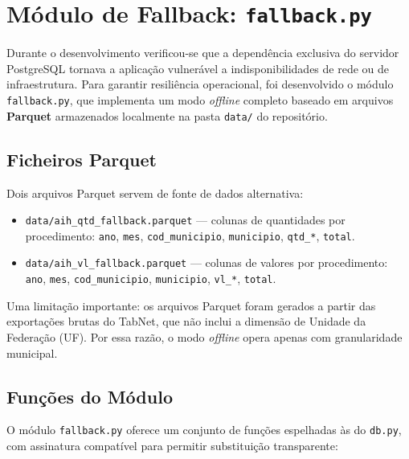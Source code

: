 \documentclass[12pt,a4paper]{report}
\begin{document}
\section{Módulo de Fallback: \texttt{fallback.py}}

Durante o desenvolvimento verificou-se que a dependência exclusiva do servidor
PostgreSQL tornava a aplicação vulnerável a indisponibilidades de rede ou de
infraestrutura. Para garantir resiliência operacional, foi desenvolvido o módulo
\texttt{fallback.py}, que implementa um modo \textit{offline} completo baseado em
arquivos \textbf{Parquet} armazenados localmente na pasta \texttt{data/} do
repositório.

\subsection{Ficheiros Parquet}

Dois arquivos Parquet servem de fonte de dados alternativa:

\begin{itemize}
    \item \texttt{data/aih\_qtd\_fallback.parquet} — colunas de quantidades por
    procedimento: \texttt{ano}, \texttt{mes}, \texttt{cod\_municipio},
    \texttt{municipio}, \texttt{qtd\_*}, \texttt{total}.
    \item \texttt{data/aih\_vl\_fallback.parquet} — colunas de valores por
    procedimento: \texttt{ano}, \texttt{mes}, \texttt{cod\_municipio},
    \texttt{municipio}, \texttt{vl\_*}, \texttt{total}.
\end{itemize}

Uma limitação importante: os arquivos Parquet foram gerados a partir das exportações
brutas do TabNet, que não inclui a dimensão de Unidade da Federação (UF). Por essa
razão, o modo \textit{offline} opera apenas com granularidade municipal.

\subsection{Funções do Módulo}

O módulo \texttt{fallback.py} oferece um conjunto de funções espelhadas às do
\texttt{db.py}, com assinatura compatível para permitir substituição transparente:
\end{document}

